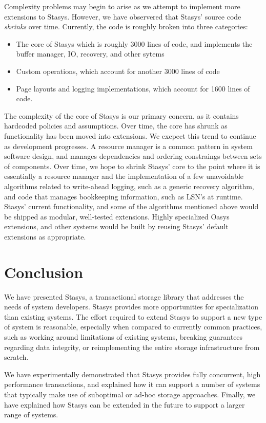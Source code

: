 \documentclass[letterpaper,twocolumn,10pt]{article}
\newcommand{\yad}{Stasys\xspace}
\newcommand{\yads}{Stasys'\xspace}
\newcommand{\oasys}{Oasys\xspace}
\begin{document}
Complexity problems may begin to arise as we attempt to implement more
extensions to \yad.  However, we have observered that \yads source
code {\em shrinks} over time.  Currently, the code is roughly broken
into three categories:
\begin{itemize}
\item The core of \yad which is roughly 3000 lines
of code, and implements the buffer manager, IO, recovery, and other
sytems
\item Custom operations, which account for another 3000 lines of code
\item Page layouts and logging implementations, which account for 1600 lines of code.
\end{itemize}

The complexity of the core of \yad is our primary concern, as it
contains hardcoded policies and assumptions.  Over time, the core has
shrunk as functionality has been moved into extensions.  We exepect
this trend to continue as development progresses.  A resource manager
is a common pattern in system software design, and manages
dependencies and ordering constraings between sets of components.
Over time, we hope to shrink \yads core to the point where it is
essentially a resource manager and the implementation of a few unavoidable
algorithms related to write-ahead logging, such as a generic recovery
algorithm, and code that manages bookkeeping information, such as 
LSN's at runtime.  \yads current functionality, and some of the algorithms
mentioned above would be shipped as modular, well-tested extensions.
Highly specialized \oasys extensions, and other systems would be built
by reusing \yads default extensions as appropriate.


\section{Conclusion}

We have presented \yad, a transactional storage library that addresses
the needs of system developers.  \yad provides more opportunities for
specialization than existing systems.  The effort required to extend
\yad to support a new type of system is reasonable, especially when
compared to currently common practices, such as working around
limitations of existing systems, breaking guarantees regarding data
integrity, or reimplementing the entire storage infrastructure from
scratch.

We have experimentally demonstrated that \yad provides fully
concurrent, high performance transactions, and explained how it can
support a number of systems that typically make use of suboptimal or
ad-hoc storage approaches.  Finally, we have explained how \yad can be
extended in the future to support a larger range of systems.
\end{document}
